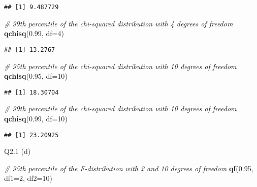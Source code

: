 \documentclass[
]{article}
\newenvironment{Shaded}{\begin{snugshade}}{\end{snugshade}}
\newcommand{\AttributeTok}[1]{\textcolor[rgb]{0.13,0.29,0.53}{#1}}
\newcommand{\CommentTok}[1]{\textcolor[rgb]{0.56,0.35,0.01}{\textit{#1}}}
\newcommand{\DecValTok}[1]{\textcolor[rgb]{0.00,0.00,0.81}{#1}}
\newcommand{\FloatTok}[1]{\textcolor[rgb]{0.00,0.00,0.81}{#1}}
\newcommand{\FunctionTok}[1]{\textcolor[rgb]{0.13,0.29,0.53}{\textbf{#1}}}
\newcommand{\NormalTok}[1]{#1}
\begin{document}
\begin{verbatim}
## [1] 9.487729
\end{verbatim}

\begin{Shaded}
\begin{Highlighting}[]
\CommentTok{\# 99th percentile of the chi{-}squared distribution with 4 degrees of freedom}
\FunctionTok{qchisq}\NormalTok{(}\FloatTok{0.99}\NormalTok{, }\AttributeTok{df=}\DecValTok{4}\NormalTok{)}
\end{Highlighting}
\end{Shaded}

\begin{verbatim}
## [1] 13.2767
\end{verbatim}

\begin{Shaded}
\begin{Highlighting}[]
\CommentTok{\# 95th percentile of the chi{-}squared distribution with 10 degrees of freedom}
\FunctionTok{qchisq}\NormalTok{(}\FloatTok{0.95}\NormalTok{, }\AttributeTok{df=}\DecValTok{10}\NormalTok{)}
\end{Highlighting}
\end{Shaded}

\begin{verbatim}
## [1] 18.30704
\end{verbatim}

\begin{Shaded}
\begin{Highlighting}[]
\CommentTok{\# 99th percentile of the chi{-}squared distribution with 10 degrees of freedom}
\FunctionTok{qchisq}\NormalTok{(}\FloatTok{0.99}\NormalTok{, }\AttributeTok{df=}\DecValTok{10}\NormalTok{)}
\end{Highlighting}
\end{Shaded}

\begin{verbatim}
## [1] 23.20925
\end{verbatim}

Q2.1 (d)

\begin{Shaded}
\begin{Highlighting}[]
\CommentTok{\# 95th percentile of the F{-}distribution with 2 and 10 degrees of freedom}
\FunctionTok{qf}\NormalTok{(}\FloatTok{0.95}\NormalTok{, }\AttributeTok{df1=}\DecValTok{2}\NormalTok{, }\AttributeTok{df2=}\DecValTok{10}\NormalTok{)}
\end{Highlighting}
\end{Shaded}
\end{document}

